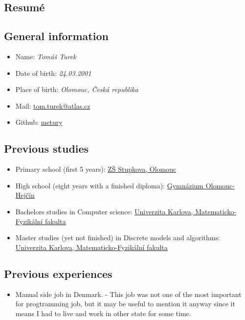 \documentclass{article}
\begin{document}
\begin{center}
\section*{Resumé}
\end{center}

\subsection*{General information}

\begin{itemize}
	\item Name: \textit{Tomáš Turek}
	\item Date of birth: \textit{24.03.2001}
	\item Place of birth: \textit{Olomouc, Česká republika}
	\item Mail: \href{mailto:tom.turek@atlas.cz}{tom.turek@atlas.cz}
	\item Github: \href{https://github.com/metury}{metury}
\end{itemize}

\subsection*{Previous studies}

\begin{itemize}
	\item Primary school (first 5 years): \href{https://zsstupkova.cz/}{ZŠ Stupkova, Olomouc}
	\item High school (eight years with a finished diploma): \href{https://www.gytool.cz/}{Gymnázium Olomouc-Hejčín}
	\item Bachelors studies in Computer science: \href{https://www.mff.cuni.cz/}{Univerzita Karlova, Matematicko-Fyzikální fakulta}
	\item Master studies (yet not finished) in Discrete models and algorithms: \href{https://www.mff.cuni.cz/}{Univerzita Karlova, Matematicko-Fyzikální fakulta}
\end{itemize}

\subsection*{Previous experiences}

\begin{itemize}
	\item Manual side job in Denmark. - This job was not one of the most important for progtramming job, but it may be useful to mention it anyway since it means I had to live and work in other state for some time.
\end{itemize}
\end{document}
